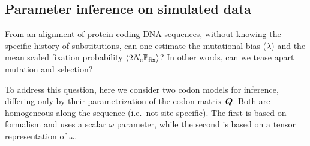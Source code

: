 \documentclass{article}
\begin{document}
\subsection{Parameter inference on simulated data}
\label{subsec:parameter-inference-on-simulated-data}

From an alignment of protein-coding {DNA} sequences, without knowing the specific history of {substitutions}, can one estimate the mutational bias ($\lambda$) and the mean scaled fixation probability $\left\langle 2 N_{\text{e}} \mathbb{P}_{\text{fix}} \right\rangle$?
In other words, can we tease apart mutation and selection?

To address this question, here we consider two codon models for inference, differing only by their parametrization of the codon matrix $\bm{Q}$.
Both are homogeneous along the sequence (i.e.~not site-specific).
The first is based on \citet{Muse1994} formalism and uses a scalar $\omega$ parameter, while the second is based on a tensor representation of $\omega$.
\end{document}
